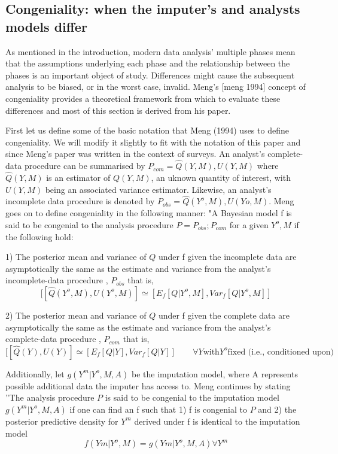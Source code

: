 \documentclass{article}
\begin{document}
	\subsection{Congeniality: when the imputer's and analysts models differ}
	As mentioned in the introduction, modern data analysis' multiple phases mean that the assumptions underlying each phase and the relationship between the phases is an important object of study. Differences might cause the subsequent analysis to be biased, or in the worst case, invalid. Meng's [meng 1994] concept of congeniality provides a theoretical framework from which to evaluate these differences and most of this section is derived from his paper.
	
	First let us define some of the basic notation that Meng (1994) uses to define congeniality. We will modify it slightly to fit with the notation of this paper and since Meng's paper was written in the context of surveys. An analyst's complete-data procedure can be summarised by $P_{com} = {\hat{Q}(Y, M), U(Y, M)}$ where $\hat{Q}(Y, M)$ is an estimator of $Q(Y, M)$, an uknown quantity of interest, with $U(Y, M)$ being an associated variance estimator. Likewise, an analyst's incomplete data procedure is denoted by $P_{obs} = {\hat{Q}(Y^{o}, M), U(Y{o}, M)}$. Meng goes on to define congeniality in the following manner: "A Bayesian model f is said to be congenial to the analysis procedure $P = {P_{obs};P_{com}}$ for a given ${Y^{o}, M}$ if the following hold:
	
	1) The posterior mean and variance of $Q$ under
	f given the incomplete data are asymptotically the
	same as the estimate and variance from the analyst's
	incomplete-data procedure , $P_{obs}$ that is, $$[[\hat{Q}(Y^{o}, M), U(Y^{o}, M)]\simeq [E_{f}[Q|{Y^{o}, M}], Var_{f}[Q|{Y^{o}, M}]]$$
	
	2)  The posterior mean and variance of $Q$ under
	f given the complete data are asymptotically the
	same as the estimate and variance from the analyst's
	complete-data procedure , $P_{com}$ that is, $$[[\hat{Q}(Y), U(Y)]\simeq [E_{f}[Q|{Y}], Var_{f}[Q|{Y}]]\qquad \forall Y\textrm{with}Y^{o}\textrm{fixed (i.e., conditioned upon)}$$
	
	Additionally, let $g(Y^{m}|{Y^{o}, M}, A)$ be the imputation model, where A represents possible additional data the imputer has access to. Meng continues by stating ''The analysis procedure $P$ is said to be congenial to the imputation model $g(Y^{m}|{Y^{o}, M}, A)$ if one can find an f such that 1) f is congenial to $P$ and 2) the posterior predictive density for $Y^{m}$ derived under f is identical to the imputation model $$f(Y{m}|{Y^{o}, M}) = g(Y{m}|{Y^{o}, M}, A) \forall Y^{m}$$
	
\end{document}
